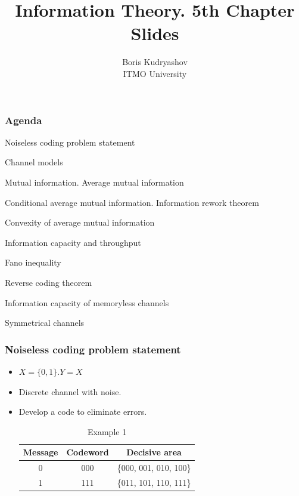 \documentclass[14pt]{beamer}
\title{\small{Information Theory. 5th Chapter Slides}}
\author{\huge{
Boris Kudryashov \\
\vspace{30pt}
ITMO University
}}
\begin{document}
\maketitle



\begin{frame}
\frametitle{Agenda}
\begin{enumerate}
\small{
    \item{Noiseless coding problem statement}
    \item{Channel models}
    \item{Mutual information. Average mutual information}
    \item{Conditional average mutual information. Information rework theorem}
    \item{Convexity of average mutual information}
    \item{Information capacity and throughput}
    \item{Fano inequality}
    \item{Reverse coding theorem}
    \item{Information capacity of memoryless channels}
    \item{Symmetrical channels}
}

\end{enumerate}
\end{frame}


\begin{frame}
\frametitle{Noiseless coding problem statement}
\begin{itemize}

    \item $X=\{0, 1\}. Y = X$
    \item Discrete channel with noise.
    \item Develop a code to eliminate errors.


    \pause
    \begin{table}[htbp]
    \begin{center}
    \caption{Example 1}
    \begin{tabular}
        {|c|c|c|} \hline %
        Message & Codeword & Decisive area \\ \hline %
        0& 000&   {\{}000, 001, 010, 100{\}} \\ \hline %
        1& 111&   {\{}011, 101, 110, 111{\}} \\ \hline %
    \end{tabular}
    \end{center}
    \end{table}


\end{itemize}
\end{frame}
\end{document}
